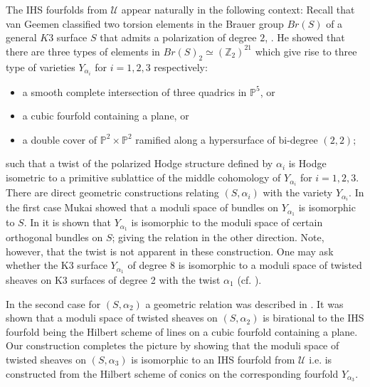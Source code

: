 \documentclass[a4paper,11pt]{amsart}
\theoremstyle{definition}
\numberwithin{equation}{section}
\numberwithin{equation}{section} \theoremstyle{definition}
\begin{document}
The IHS fourfolds from $\mathcal{U}$ appear naturally in the following context: 
Recall that van Geemen classified two torsion elements in the Brauer group $Br(S)$ of a general $K3$ surface $S$ that admits a polarization of degree $2$, \cite{vG}. He showed that there are three types of elements in $Br(S)_2\simeq ({\mathbb{Z}}_2)^{21}$ which give rise to three type of varieties $Y_{\alpha_i}$ for $i=1,2,3$ respectively:
\begin{itemize}
\item  a smooth complete intersection of three quadrics in ${{\mathbb{P}}}^5$, or
\item  a cubic fourfold containing a plane, or
\item  a double cover of ${{\mathbb{P}}}^2 \times {{\mathbb{P}}}^2$ ramified along a hypersurface of bi-degree $(2, 2);$
\end{itemize}
such that a twist of the polarized Hodge structure defined by $\alpha_i$ is Hodge isometric to a primitive sublattice of the middle cohomology of $Y_{\alpha_i}$ for $i=1,2,3$.
There are direct geometric constructions relating $(S,\alpha_i)$ with the variety $Y_{\alpha_i}$. In the first case Mukai showed \cite{Mu2} that a moduli space of bundles on $Y_{\alpha_1}$ is isomorphic
to $S$. In 
 \cite{Bh} it is shown that $Y_{\alpha_1}$ is isomorphic 
to the moduli space of certain orthogonal bundles on $S$; giving the relation in the other direction.
Note, however, that the twist is not apparent in these construction.
One may ask whether the  K3 surface $Y_{\alpha_1}$ of degree $8$ is isomorphic to a moduli
space of twisted sheaves  on
K3 surfaces of degree 2 with the twist $\alpha_1$ (cf. \cite[\S 1]{MSTV}).

In the second case for $(S,\alpha_2)$ a geometric relation was described in \cite{MS}.
It was shown that a moduli space of twisted sheaves on $(S,\alpha_2)$ is birational to the IHS fourfold being the Hilbert scheme of lines
on a cubic fourfold containing a plane.
Our construction completes the picture by showing that the moduli space of twisted sheaves on $(S,\alpha_3)$
is isomorphic to an IHS fourfold from $\mathcal{U}$ i.e. is constructed from the Hilbert scheme of conics on the corresponding fourfold $Y_{\alpha_3}$.
\end{document}
